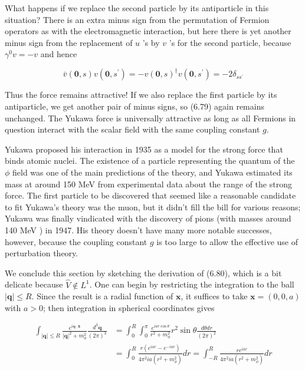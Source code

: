 \documentclass[10pt, letterpaper]{article}
\begin{document}
What happens if we replace the second particle by its antiparticle in this situation? There is an extra minus sign from the permutation of Fermion operators as with the electromagnetic interaction, but here there is yet another minus sign from the replacement of $u$ 's by $v$ 's for the second particle, because $\gamma^{0} v=-v$ and hence

$$
\bar{v}(\mathbf{0}, s) v\left(\mathbf{0}, s^{\prime}\right)=-v(\mathbf{0}, s)^{\dagger} v\left(\mathbf{0}, s^{\prime}\right)=-2 \delta_{s s^{\prime}}
$$

Thus the force remains attractive! If we also replace the first particle by its antiparticle, we get another pair of minus signs, so (6.79) again remains unchanged. The Yukawa force is universally attractive as long as all Fermions in question interact with the scalar field with the same coupling constant $g$.

Yukawa proposed his interaction in 1935 as a model for the strong force that binds atomic nuclei. The existence of a particle representing the quantum of the $\phi$ field was one of the main predictions of the theory, and Yukawa estimated its mass at around 150 MeV from experimental data about the range of the strong force. The first particle to be discovered that seemed like a reasonable candidate to fit Yukawa's theory was the muon, but it didn't fill the bill for various reasons; Yukawa was finally vindicated with the discovery of pions (with masses around 140 MeV ) in 1947. His theory doesn't have many more notable successes, however, because the coupling constant $g$ is too large to allow the effective use of perturbation theory.

We conclude this section by sketching the derivation of (6.80), which is a bit delicate because $\widehat{V} \notin L^{1}$. One can begin by restricting the integration to the ball $|\mathbf{q}| \leq R$. Since the result is a radial function of $\mathbf{x}$, it suffices to take $\mathbf{x}=(0,0, a)$ with $a>0$; then integration in spherical coordinates gives

$$
\begin{aligned}
\int_{|\mathbf{q}| \leq R} \frac{e^{i \mathbf{q} \cdot \mathbf{x}}}{|\mathbf{q}|^{2}+m_{\phi}^{2}} \frac{d^{3} \mathbf{q}}{(2 \pi)^{3}} & =\int_{0}^{R} \int_{0}^{\pi} \frac{e^{i a r \cos \theta}}{r^{2}+m_{\phi}^{2}} r^{2} \sin \theta \frac{d \theta d r}{(2 \pi)^{2}} \\
& =\int_{0}^{R} \frac{r\left(e^{i a r}-e^{-i a r}\right)}{4 \pi^{2} i a\left(r^{2}+m_{\phi}^{2}\right)} d r=\int_{-R}^{R} \frac{r e^{i a r}}{4 \pi^{2} i a\left(r^{2}+m_{\phi}^{2}\right)} d r
\end{aligned}
$$
\end{document}

